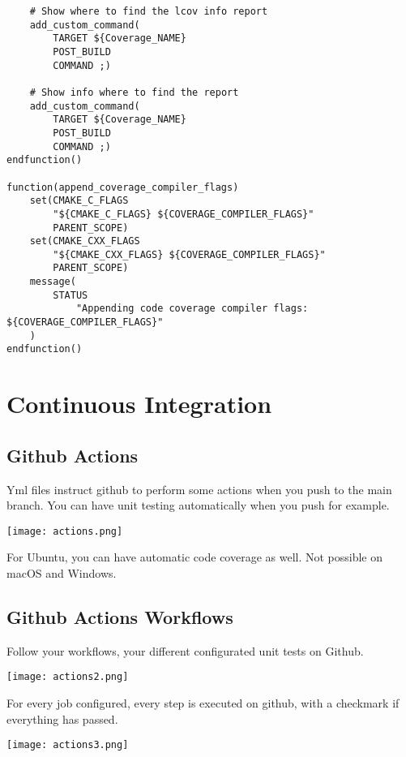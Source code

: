 \begin{verbatim}
    # Show where to find the lcov info report
    add_custom_command(
        TARGET ${Coverage_NAME}
        POST_BUILD
        COMMAND ;)

    # Show info where to find the report
    add_custom_command(
        TARGET ${Coverage_NAME}
        POST_BUILD
        COMMAND ;)
endfunction()

function(append_coverage_compiler_flags)
    set(CMAKE_C_FLAGS
        "${CMAKE_C_FLAGS} ${COVERAGE_COMPILER_FLAGS}"
        PARENT_SCOPE)
    set(CMAKE_CXX_FLAGS
        "${CMAKE_CXX_FLAGS} ${COVERAGE_COMPILER_FLAGS}"
        PARENT_SCOPE)
    message(
        STATUS
            "Appending code coverage compiler flags: ${COVERAGE_COMPILER_FLAGS}"
    )
endfunction()
\end{verbatim}


\section{Continuous Integration}


\subsection{Github Actions}

Yml files instruct github to perform some actions when you push to the main branch. 
You can have unit testing automatically when you push for example.


\begin{center}
    \texttt{[image: actions.png]}
\end{center}

For Ubuntu, you can have automatic code coverage as well. Not possible on macOS and Windows.


\subsection{Github Actions Workflows}

Follow your workflows, your different configurated unit tests on Github.


\begin{center}
    \texttt{[image: actions2.png]}
\end{center}

For every job configured, every step is executed on github, with a checkmark if everything has passed.


\begin{center}
    \texttt{[image: actions3.png]}
\end{center}

